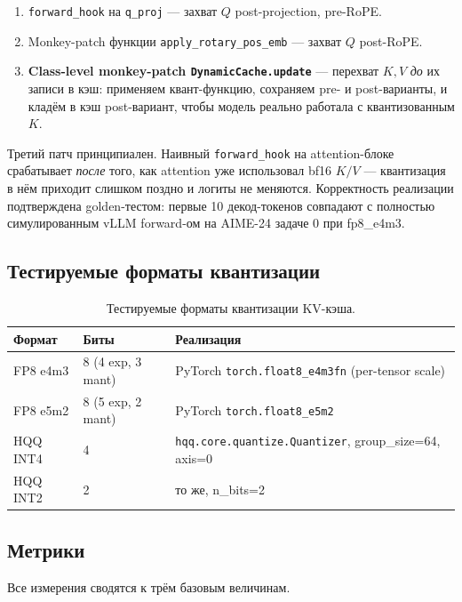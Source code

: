 \documentclass[a4paper,12pt]{article}
\begin{document}
\begin{enumerate}[label=\arabic*.,leftmargin=*]
\item \texttt{forward\_hook} на \texttt{q\_proj} — захват $Q$
  post-projection, pre-RoPE.
\item Monkey-patch функции \texttt{apply\_rotary\_pos\_emb} — захват $Q$
  post-RoPE.
\item \textbf{Class-level monkey-patch \texttt{DynamicCache.update}} ---
  перехват $K, V$ \textit{до} их записи в кэш: применяем квант-функцию,
  сохраняем pre- и post-варианты, и кладём в кэш post-вариант, чтобы
  модель реально работала с квантизованным $K$.
\end{enumerate}

Третий патч принципиален. Наивный \texttt{forward\_hook} на
attention-блоке срабатывает \textit{после} того, как attention уже
использовал bf16 $K/V$ --- квантизация в нём приходит слишком поздно и
логиты не меняются. Корректность реализации подтверждена golden-тестом:
первые 10 декод-токенов совпадают с полностью симулированным vLLM
forward-ом на AIME-24 задаче 0 при fp8\_e4m3.

\subsection{Тестируемые форматы квантизации}

\begin{table}[H]
\centering
\caption{Тестируемые форматы квантизации KV-кэша.}
\label{tab:formats}
\begin{tabular}{lll}
\toprule
Формат & Биты & Реализация \\
\midrule
FP8 e4m3 & 8 (4 exp, 3 mant) & PyTorch \texttt{torch.float8\_e4m3fn} (per-tensor scale) \\
FP8 e5m2 & 8 (5 exp, 2 mant) & PyTorch \texttt{torch.float8\_e5m2} \\
HQQ INT4 & 4 & \texttt{hqq.core.quantize.Quantizer}, group\_size=64, axis=0 \\
HQQ INT2 & 2 & то же, n\_bits=2 \\
\bottomrule
\end{tabular}
\end{table}

\subsection{Метрики}

Все измерения сводятся к трём базовым величинам.
\end{document}
